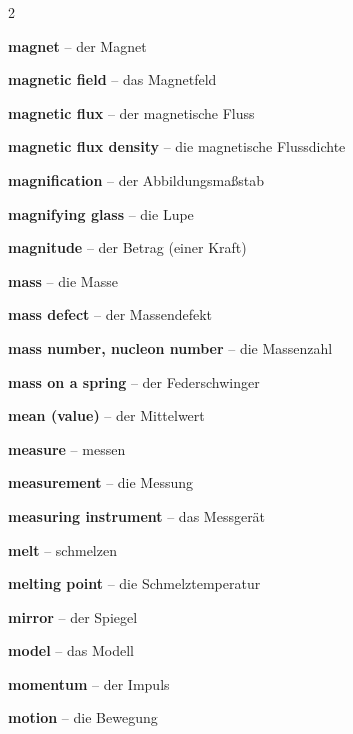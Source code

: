 \begin{multicols}{2}
\par\nopagebreak
\textbf{magnet} -- der Magnet\dotfill\hyperref[e:174]{\pageref*{e:174}}\par
\textbf{magnetic field} -- das Magnetfeld\dotfill\hyperref[e:178]{\pageref*{e:178}}\par
\textbf{magnetic flux} -- der magnetische Fluss\dotfill\hyperref[e:180]{\pageref*{e:180}}\par
\textbf{magnetic flux density} -- die magnetische Flussdichte\dotfill\hyperref[e:179]{\pageref*{e:179}}\par
\textbf{magnification} -- der Abbildungsmaßstab\dotfill\hyperref[e:252]{\pageref*{e:252}}\par
\textbf{magnifying glass} -- die Lupe\dotfill\hyperref[e:253]{\pageref*{e:253}}\par
\textbf{magnitude} -- der Betrag (einer Kraft)\dotfill\hyperref[e:61]{\pageref*{e:61}}\par
\textbf{mass} -- die Masse\dotfill\hyperref[e:56]{\pageref*{e:56}}\par
\textbf{mass defect} -- der Massendefekt\dotfill\hyperref[e:289]{\pageref*{e:289}}\par
\textbf{mass number, nucleon number} -- die Massenzahl\dotfill\hyperref[e:268]{\pageref*{e:268}}\par
\textbf{mass on a spring} -- der Federschwinger\dotfill\hyperref[e:192]{\pageref*{e:192}}\par
\textbf{mean (value)} -- der Mittelwert\dotfill\hyperref[e:15]{\pageref*{e:15}}\par
\textbf{measure} -- messen\dotfill\hyperref[e:8]{\pageref*{e:8}}\par
\textbf{measurement} -- die Messung\dotfill\hyperref[e:9]{\pageref*{e:9}}\par
\textbf{measuring instrument} -- das Messgerät\dotfill\hyperref[e:11]{\pageref*{e:11}}\par
\textbf{melt} -- schmelzen\dotfill\hyperref[e:129]{\pageref*{e:129}}\par
\textbf{melting point} -- die Schmelztemperatur\dotfill\hyperref[e:135]{\pageref*{e:135}}\par
\textbf{mirror} -- der Spiegel\dotfill\hyperref[e:232]{\pageref*{e:232}}\par
\textbf{model} -- das Modell\dotfill\hyperref[e:22]{\pageref*{e:22}}\par
\textbf{momentum} -- der Impuls\dotfill\hyperref[e:79]{\pageref*{e:79}}\par
\textbf{motion} -- die Bewegung\dotfill\hyperref[e:30]{\pageref*{e:30}}\par


\end{multicols}
